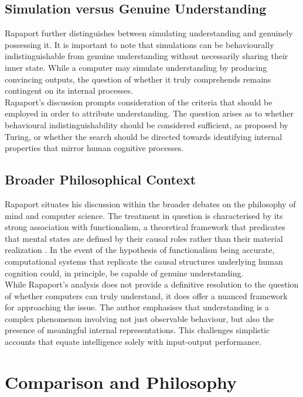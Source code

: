\documentclass[runningheads]{llncs}
\begin{document}
\subsection{Simulation versus Genuine Understanding}
%
Rapaport further distinguishes between simulating understanding and genuinely possessing it. It is important to note that simulations can be behaviourally indistinguishable from genuine understanding without necessarily sharing their inner state. While a computer may simulate understanding by producing convincing outputs, the question of whether it truly comprehends remains contingent on its internal processes.
\\
Rapaport's discussion prompts consideration of the criteria that should be employed in order to attribute understanding. The question arises as to whether behavioural indistinguishability should be considered sufficient, as proposed by Turing, or whether the search should be directed towards identifying internal properties that mirror human cognitive processes.
%
%
\subsection{Broader Philosophical Context}
%
Rapaport situates his discussion within the broader debates on the philosophy of mind and computer science. The treatment in question is characterised by its strong association with functionalism, a theoretical framework that predicates that mental states are defined by their causal roles rather than their material realization 
\cite{rapaport}. 
In the event of the hypothesis of functionalism being accurate, computational systems that replicate the causal structures underlying human cognition could, in principle, be capable of genuine understanding.
\\
While Rapaport's analysis does not provide a definitive resolution to the question of whether computers can truly understand, it does offer a nuanced framework for approaching the issue. The author emphasises that understanding is a complex phenomenon involving not just observable behaviour, but also the presence of meaningful internal representations. This challenges simplistic accounts that equate intelligence solely with input-output performance.
%
%
%
%
\section{Comparison and Philosophy}
\end{document}
